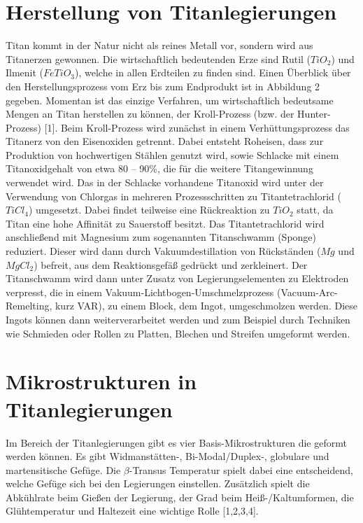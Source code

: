 \section{Herstellung von Titanlegierungen}
Titan kommt in der Natur nicht als reines Metall vor, sondern wird aus Titanerzen gewonnen. Die wirtschaftlich bedeutenden Erze sind Rutil ($TiO_2$) und Ilmenit ($FeTiO_3$), welche in allen Erdteilen zu finden sind. Einen Überblick über den Herstellungsprozess vom Erz bis zum Endprodukt ist in Abbildung 2 gegeben. Momentan ist das einzige Verfahren, um wirtschaftlich bedeutsame Mengen an Titan herstellen zu können, der Kroll-Prozess (bzw. der Hunter-Prozess) [1]. Beim Kroll-Prozess wird zunächst in einem Verhüttungsprozess das Titanerz von den Eisenoxiden getrennt. Dabei entsteht Roheisen, dass zur Produktion von hochwertigen Stählen genutzt wird, 
sowie Schlacke mit einem Titanoxidgehalt von etwa 80 -- 90\%, die für die weitere Titangewinnung verwendet wird. Das in der Schlacke vorhandene Titanoxid wird unter der Verwendung von Chlorgas in mehreren Prozessschritten zu Titantetrachlorid ($TiCl_4$) umgesetzt. Dabei findet teilweise eine Rückreaktion zu $TiO_2$ statt, da Titan eine hohe Affinität zu Sauerstoff besitzt. Das Titantetrachlorid wird anschließend mit Magnesium  zum sogenannten Titanschwamm (Sponge) reduziert. Dieser wird dann durch Vakuumdestillation von Rückständen ($Mg$ und $MgCl_2$) befreit, aus dem Reaktionsgefäß gedrückt und zerkleinert. Der Titanschwamm wird dann unter Zusatz von Legierungselementen zu Elektroden verpresst, die in einem Vakuum-Lichtbogen-Umschmelzprozess (Vacuum-Arc-Remelting, kurz VAR), zu einem Block, dem Ingot, umgeschmolzen werden. Diese Ingots können dann weiterverarbeitet werden und zum Beispiel durch Techniken wie Schmieden oder Rollen zu Platten, Blechen und Streifen umgeformt werden. 



\section{Mikrostrukturen in Titanlegierungen} 
Im Bereich der Titanlegierungen gibt es vier Basis-Mikrostrukturen die geformt werden können. Es gibt Widmanstätten-, Bi-Modal/Duplex-, globulare und martensitische Gefüge. Die $\beta$-Transus Temperatur spielt dabei eine entscheidend, welche Gefüge sich bei den Legierungen einstellen. Zusätzlich spielt die Abkühlrate beim Gießen der Legierung, der Grad beim Heiß-/Kaltumformen, die Glühtemperatur und Haltezeit eine wichtige Rolle [1,2,3,4]. 



